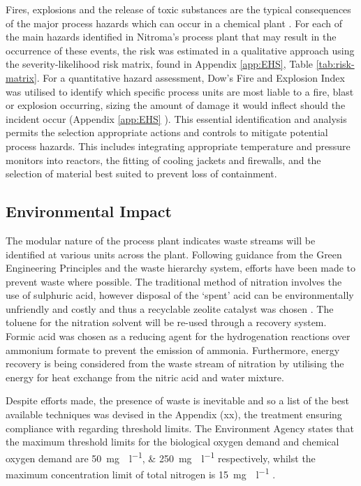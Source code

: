 Fires, explosions and the release of toxic substances are the typical consequences of the major process hazards which can occur in a chemical plant \cite{mannan_lees_2012}. For each of the main hazards identified in Nitroma's process plant that may result in the occurrence of these events, the risk was estimated in a qualitative approach using the severity-likelihood risk matrix, found in Appendix \ref{app:EHS}, Table \ref{tab:risk-matrix}. For a quantitative hazard assessment, Dow's Fire and Explosion Index was utilised to identify which specific process units are most liable to  a fire, blast or explosion occurring, sizing the amount of damage it would inflect should the incident occur (Appendix \ref{app:EHS} ). This essential identification and analysis permits the selection appropriate actions and controls to mitigate potential process hazards. This includes integrating appropriate temperature and pressure monitors into reactors, the fitting of cooling jackets and firewalls, and the selection of material best suited to prevent loss of containment.


\subsection{Environmental Impact}

The modular nature of the process plant indicates waste streams will be identified at various units across the plant. Following guidance from the Green Engineering Principles and the waste hierarchy system, efforts have been made to prevent waste where possible. The traditional method of nitration involves the use of sulphuric acid, however disposal of the ‘spent’ acid can be environmentally unfriendly and costly and thus a recyclable zeolite catalyst was chosen \cite{smith_superior_1996}. The toluene for the nitration solvent will be re-used through a recovery system. Formic acid was chosen as a reducing agent for the hydrogenation reactions over ammonium formate to prevent the emission of  ammonia. Furthermore, energy recovery is being considered from the waste stream of nitration by utilising the energy for heat exchange from the nitric acid and water mixture. 

Despite efforts made, the presence of waste is inevitable and so a list of the best available techniques was devised in the Appendix (xx), the treatment ensuring compliance with regarding threshold limits. The Environment Agency states that the maximum threshold limits for the biological oxygen demand and chemical oxygen demand are \SIlist{50;250}{\mg{}\per\l} respectively, whilst the maximum concentration limit of total nitrogen is \SI{15}{\mg{}\per\l} \cite{noauthor_waste_nodate}. 